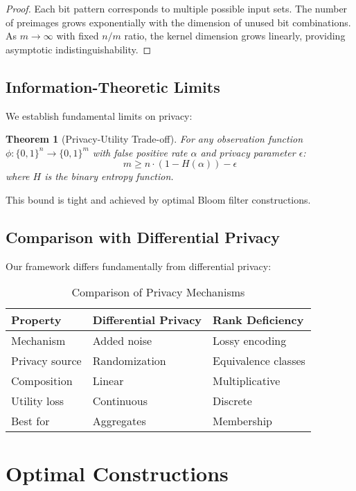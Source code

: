 \documentclass[11pt]{article}
\newtheorem{theorem}{Theorem}
\begin{document}
\begin{proof}
Each bit pattern corresponds to multiple possible input sets. The number of preimages grows exponentially with the dimension of unused bit combinations. As $m \to \infty$ with fixed $n/m$ ratio, the kernel dimension grows linearly, providing asymptotic indistinguishability.
\end{proof}

\subsection{Information-Theoretic Limits}

We establish fundamental limits on privacy:

\begin{theorem}[Privacy-Utility Trade-off]
For any observation function $\phi: \{0,1\}^n \to \{0,1\}^m$ with false positive rate $\alpha$ and privacy parameter $\epsilon$:
$$m \geq n \cdot (1 - H(\alpha)) - \epsilon$$
where $H$ is the binary entropy function.
\end{theorem}

This bound is tight and achieved by optimal Bloom filter constructions.

\subsection{Comparison with Differential Privacy}

Our framework differs fundamentally from differential privacy:

\begin{table}[h]
\centering
\caption{Comparison of Privacy Mechanisms}
\begin{tabular}{lll}
\toprule
Property & Differential Privacy & Rank Deficiency \\
\midrule
Mechanism & Added noise & Lossy encoding \\
Privacy source & Randomization & Equivalence classes \\
Composition & Linear & Multiplicative \\
Utility loss & Continuous & Discrete \\
Best for & Aggregates & Membership \\
\bottomrule
\end{tabular}
\end{table}

\section{Optimal Constructions}
\end{document}
